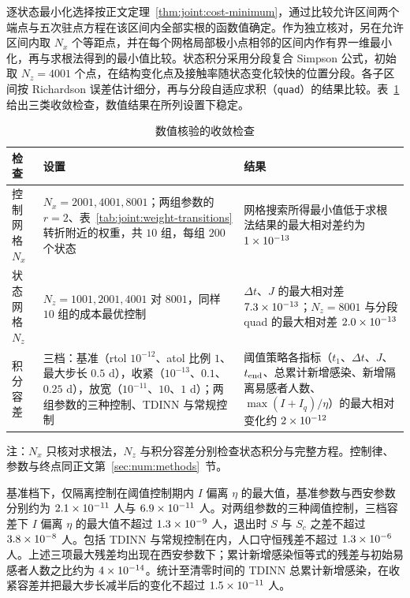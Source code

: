 逐状态最小化选择按正文定理~\ref{thm:joint:cost-minimum}，通过比较允许区间两个端点与五次驻点方程在该区间内全部实根的函数值确定。作为独立核对，另在允许区间内取 $N_x$ 个等距点，并在每个网格局部极小点相邻的区间内作有界一维最小化，再与求根法得到的最小值比较。状态积分采用分段复合 Simpson 公式，初始取 $N_z=4001$ 个点，在结构变化点及接触率随状态变化较快的位置分段。各子区间按 Richardson 误差估计细分，再与分段自适应求积（\texttt{quad}）的结果比较。表~\ref{tab:sup:convergence}给出三类收敛检查，数值结果在所列设置下稳定。
\begin{table}[htbp]
\centering\small
\renewcommand{\arraystretch}{1.2}
\begin{threeparttable}
\caption{数值核验的收敛检查}
\label{tab:sup:convergence}
\begin{tabularx}{\linewidth}{@{}l>{\raggedright\arraybackslash}X>{\raggedright\arraybackslash}X@{}}
\toprule
检查 & 设置 & 结果\\
\midrule
控制网格 $N_x$ & $N_x=2001,4001,8001$；两组参数的 $r=2$、表~\ref{tab:joint:weight-transitions}转折附近的权重，共 $10$ 组，每组 $200$ 个状态 & 网格搜索所得最小值低于求根法结果的最大相对差约为 $1\times10^{-13}$\\
状态网格 $N_z$ & $N_z=1001,2001,4001$ 对 $8001$，同样 $10$ 组的成本最优控制 & $\Delta t$、$J$ 的最大相对差 $7.3\times10^{-13}$；$N_z=8001$ 与分段 quad 的最大相对差 $2.0\times10^{-13}$\\
积分容差 & 三档：基准（rtol $10^{-12}$、atol 比例 $1$、最大步长 $0.5$ d），收紧（$10^{-13}$、$0.1$、$0.25$ d），放宽（$10^{-11}$、$10$、$1$ d）；两组参数的三种控制、TDINN 与常规控制 & 阈值策略各指标（$t_1$、$\Delta t$、$J$、$t_{\rm end}$、总累计新增感染、新增隔离易感者人数、$\max(I+I_q)/\eta$）的最大相对变化约 $2\times10^{-12}$\\
\bottomrule
\end{tabularx}
\begin{tablenotes}[flushleft]\footnotesize
\item 注：$N_x$ 只核对求根法，$N_z$ 与积分容差分别检查状态积分与完整方程。控制律、参数与终点同正文第~\ref{sec:num:methods}~节。
\end{tablenotes}
\end{threeparttable}
\end{table}

基准档下，仅隔离控制在阈值控制期内 $I$ 偏离 $\eta$ 的最大值，基准参数与西安参数分别约为 $2.1\times10^{-11}$ 人与 $6.9\times10^{-11}$ 人。对两组参数的三种阈值控制，三档容差下 $I$ 偏离 $\eta$ 的最大值不超过 $1.3\times10^{-9}$ 人，退出时 $S$ 与 $S_c$ 之差不超过 $3.8\times10^{-8}$ 人。包括 TDINN 与常规控制在内，人口守恒残差不超过 $1.3\times10^{-6}$ 人。上述三项最大残差均出现在西安参数下；累计新增感染恒等式的残差与初始易感者人数之比约为 $4\times10^{-14}$。统计至清零时间的 TDINN 总累计新增感染，在收紧容差并把最大步长减半后的变化不超过 $1.5\times10^{-11}$ 人。
